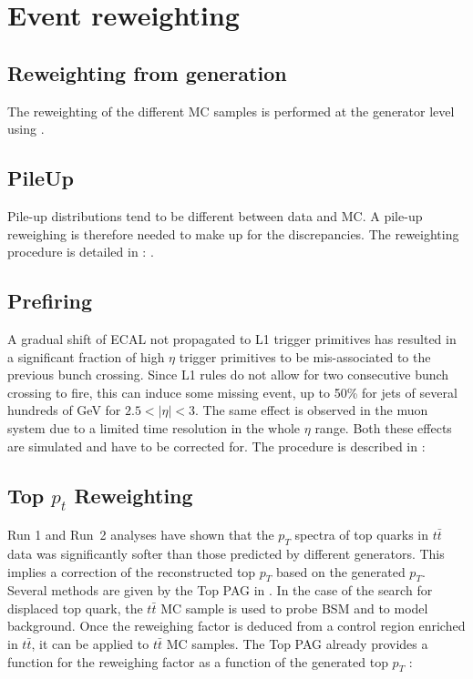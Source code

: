 \documentclass{cernatlasnote}
\begin{document}
\newpage

\section{Event reweighting}
    \label{EVENT_W}
    \subsection{Reweighting from generation}
        The reweighting of the different MC samples is performed at the generator level using \cite{LHEReaderCMSSW}.
    \subsection{PileUp}
        Pile-up distributions tend to be different between data and MC. A pile-up reweighing is therefore needed to make up for the discrepancies. The reweighting procedure is detailed in : \cite{PileupMCReweightingUtilities}.
        
    \subsection{Prefiring}
        A gradual shift of ECAL not propagated to L1 trigger primitives has resulted in a significant fraction of high $\eta$ trigger primitives to be mis-associated to the previous bunch crossing. Since L1 rules do not allow for two consecutive bunch crossing to fire, this can induce some missing event, up to 50\% for jets of several hundreds of GeV for $2.5<|\eta|<3$. The same effect is observed in the muon system due to a limited time resolution in the whole $\eta$ range. Both these effects are simulated and have to be corrected for. The procedure is described in : \cite{L1PrefiringWeightRecipe}
    \subsection{Top $p_{t}$ Reweighting}
            
            Run 1 and Run~2 analyses have shown that the $p_T$ spectra of top quarks in $t\bar{t}$ data was significantly softer than those predicted by different generators. This implies a correction of the reconstructed top $p_T$ based  on the generated $p_T$. Several methods are given by the Top PAG in \cite{TopPtReweighting}. In the case of the search for displaced top quark, the $t\bar{t}$ MC sample is used to probe BSM and to model background. Once the reweighing factor is deduced from a control region enriched in $t\bar{t}$, it can be applied to $t\bar{t}$ MC samples. The Top PAG already provides a function for the reweighing factor as a function of the generated top $p_T$ :
\end{document}
